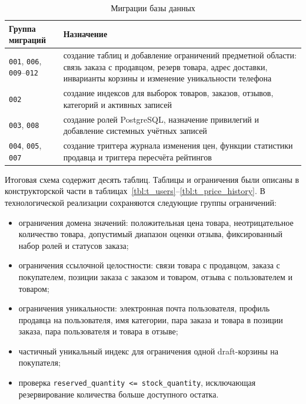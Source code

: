 \begin{table}[H]
    \caption{Миграции базы данных}
    \label{tbl:tech_migrations}
    \begin{tabular}{|p{}|p{}|}
        \hline
        \textbf{Группа миграций} & \textbf{Назначение} \\ \hline
        \texttt{001}, \texttt{006}, \texttt{009}--\texttt{012} & создание таблиц и добавление ограничений предметной области: связь заказа с продавцом, резерв товара, адрес доставки, инварианты корзины и изменение уникальности телефона \\ \hline
        \texttt{002} & создание индексов для выборок товаров, заказов, отзывов, категорий и активных записей \\ \hline
        \texttt{003}, \texttt{008} & создание ролей PostgreSQL, назначение привилегий и добавление системных учётных записей \\ \hline
        \texttt{004}, \texttt{005}, \texttt{007} & создание триггера журнала изменения цен, функции статистики продавца и триггера пересчёта рейтингов \\ \hline
    \end{tabular}
\end{table}

Итоговая схема содержит десять таблиц. Таблицы и ограничения были описаны в конструкторской части в таблицах~\ref{tbl:t_users}--\ref{tbl:t_price_history}. В технологической реализации сохраняются следующие группы ограничений:

\begin{itemize}
    \item ограничения домена значений: положительная цена товара, неотрицательное количество товара, допустимый диапазон оценки отзыва, фиксированный набор ролей и статусов заказа;
    \item ограничения ссылочной целостности: связи товара с продавцом, заказа с покупателем, позиции заказа с заказом и товаром, отзыва с пользователем и товаром;
    \item ограничения уникальности: электронная почта пользователя, профиль продавца на пользователя, имя категории, пара заказа и товара в позиции заказа, пара пользователя и товара в отзыве;
    \item частичный уникальный индекс для ограничения одной draft-корзины на покупателя;
    \item проверка \texttt{reserved\_quantity <= stock\_quantity}, исключающая резервирование количества больше доступного остатка.
\end{itemize}

